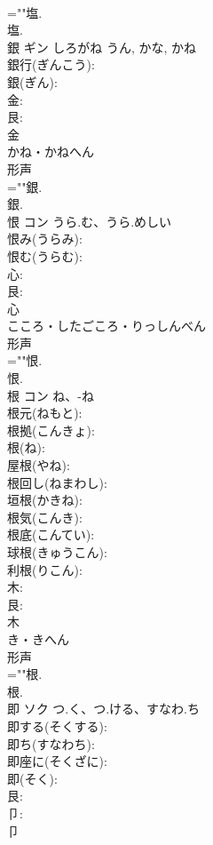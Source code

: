 \documentclass[8pt]{extreport}
\begin{document}
\begin{CJK}{UTF8}{min}
\\	=""塩.
\\	塩.
\\	銀	ギン	しろがね	うん, かな, かね	
\\	銀行(ぎんこう): 
\\	銀(ぎん): 
\\	金: 
\\	艮: 
\\	金	
\\	かね・かねへん	
\\	形声 
\\	=""銀.
\\	銀.
\\	恨	コン	うら.む、うら.めしい		
\\	恨み(うらみ): 
\\	恨む(うらむ): 
\\	心: 
\\	艮: 
\\	心	
\\	こころ・したごころ・りっしんべん	
\\	形声 
\\	=""恨.
\\	恨.
\\	根	コン	ね、-ね		
\\	根元(ねもと): 
\\	根拠(こんきょ): 
\\	根(ね): 
\\	屋根(やね): 
\\	根回し(ねまわし): 
\\	垣根(かきね): 
\\	根気(こんき): 
\\	根底(こんてい): 
\\	球根(きゅうこん): 
\\	利根(りこん): 
\\	木: 
\\	艮: 
\\	木	
\\	き・きへん	
\\	形声 
\\	=""根.
\\	根.
\\	即	ソク	つ.く、つ.ける、すなわ.ち		
\\	即する(そくする): 
\\	即ち(すなわち): 
\\	即座に(そくざに): 
\\	即(そく): 
\\	艮: 
\\	卩: 
\\	卩	

\end{CJK}
\end{document}
